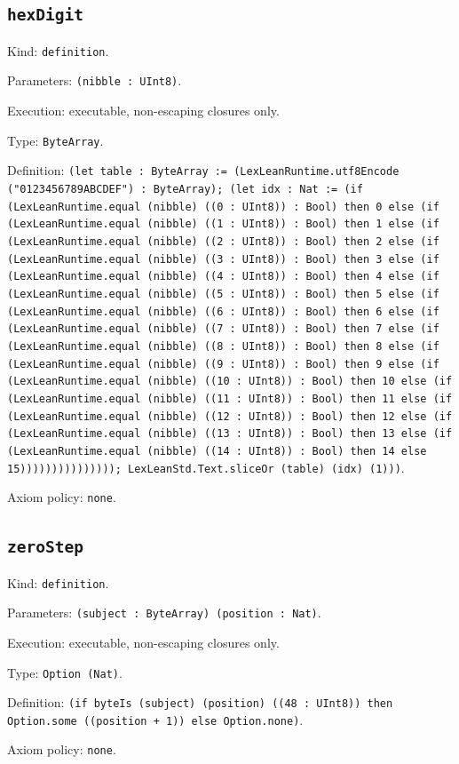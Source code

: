 \documentclass[11pt]{article}
\begin{document}
\subsection*{\texttt{hexDigit}}
\noindent Kind: \texttt{definition}.\par
\noindent Parameters: \texttt{(nibble : UInt8)}.\par
\noindent Execution: executable, non-escaping closures only.\par
\noindent Type: \texttt{ByteArray}.\par
\noindent Definition: \texttt{(let table : ByteArray := (LexLeanRuntime.utf8Encode ("0123456789ABCDEF") : ByteArray); (let idx : Nat := (if (LexLeanRuntime.equal (nibble) ((0 : UInt8)) : Bool) then 0 else (if (LexLeanRuntime.equal (nibble) ((1 : UInt8)) : Bool) then 1 else (if (LexLeanRuntime.equal (nibble) ((2 : UInt8)) : Bool) then 2 else (if (LexLeanRuntime.equal (nibble) ((3 : UInt8)) : Bool) then 3 else (if (LexLeanRuntime.equal (nibble) ((4 : UInt8)) : Bool) then 4 else (if (LexLeanRuntime.equal (nibble) ((5 : UInt8)) : Bool) then 5 else (if (LexLeanRuntime.equal (nibble) ((6 : UInt8)) : Bool) then 6 else (if (LexLeanRuntime.equal (nibble) ((7 : UInt8)) : Bool) then 7 else (if (LexLeanRuntime.equal (nibble) ((8 : UInt8)) : Bool) then 8 else (if (LexLeanRuntime.equal (nibble) ((9 : UInt8)) : Bool) then 9 else (if (LexLeanRuntime.equal (nibble) ((10 : UInt8)) : Bool) then 10 else (if (LexLeanRuntime.equal (nibble) ((11 : UInt8)) : Bool) then 11 else (if (LexLeanRuntime.equal (nibble) ((12 : UInt8)) : Bool) then 12 else (if (LexLeanRuntime.equal (nibble) ((13 : UInt8)) : Bool) then 13 else (if (LexLeanRuntime.equal (nibble) ((14 : UInt8)) : Bool) then 14 else 15))))))))))))))); LexLeanStd.Text.sliceOr (table) (idx) (1)))}.\par
\noindent Axiom policy: \texttt{none}.\par
\subsection*{\texttt{zeroStep}}
\noindent Kind: \texttt{definition}.\par
\noindent Parameters: \texttt{(subject : ByteArray) (position : Nat)}.\par
\noindent Execution: executable, non-escaping closures only.\par
\noindent Type: \texttt{Option (Nat)}.\par
\noindent Definition: \texttt{(if byteIs (subject) (position) ((48 : UInt8)) then Option.some ((position + 1)) else Option.none)}.\par
\noindent Axiom policy: \texttt{none}.\par
\end{document}
